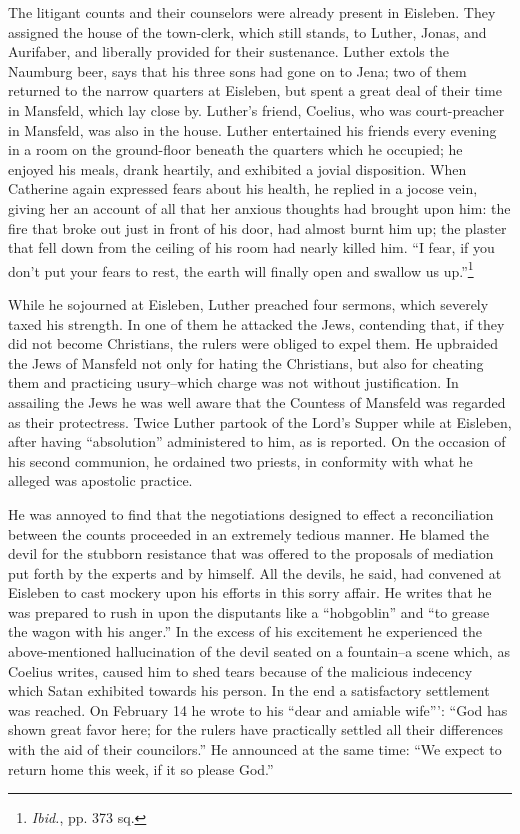 The litigant counts and their counselors were already present in
Eisleben. They assigned the house of the town-clerk, which still
stands, to Luther, Jonas, and Aurifaber, and liberally provided for
their sustenance. Luther extols the Naumburg beer, says that his
three sons had gone on to Jena; two of them returned to the narrow
quarters at Eisleben, but spent a great deal of their time in Mansfeld,
which lay close by. Luther’s friend, Coelius, who was court-preacher
in Mansfeld, was also in the house. Luther entertained his
friends every evening in a room on the ground-floor beneath the quarters
which he occupied; he enjoyed his meals, drank heartily, and exhibited
a jovial disposition. When Catherine again expressed fears
about his health, he replied in a jocose vein, giving her an account
of all that her anxious thoughts had brought upon him: the fire that
broke out just in front of his door, had almost burnt him up; the
plaster that fell down from the ceiling of his room had nearly killed
him. “I fear, if you don’t put your fears to rest, the earth will finally
open and swallow us up.”\footnote{\textit{Ibid.}, pp. 373 sq.}

While he sojourned at Eisleben, Luther preached four sermons,
which severely taxed his strength. In one of them he attacked the
Jews, contending that, if they did not become Christians, the rulers
were obliged to expel them. He upbraided the Jews of Mansfeld not
only for hating the Christians, but also for cheating them and practicing
usury--which charge was not without justification. In assailing
the Jews he was well aware that the Countess of Mansfeld was regarded
as their protectress. Twice Luther partook of the Lord’s
Supper while at Eisleben, after having “absolution” administered to
him, as is reported. On the occasion of his second communion, he
ordained two priests, in conformity with what he alleged was apostolic practice.

He was annoyed to find that the negotiations designed to effect a
reconciliation between the counts proceeded in an extremely tedious
manner. He blamed the devil for the stubborn resistance that was
offered to the proposals of mediation put forth by the experts and by
himself. All the devils, he said, had convened at Eisleben to cast
mockery upon his efforts in this sorry affair. He writes that he was
prepared to rush in upon the disputants like a “hobgoblin” and “to
grease the wagon with his anger.” In the excess of his excitement
he experienced the above-mentioned hallucination of the devil seated
on a fountain--a scene which, as Coelius writes, caused him to shed
tears because of the malicious indecency which Satan exhibited
towards his person. In the end a satisfactory settlement was reached.
On February 14 he wrote to his “dear and amiable wife”’: “God has
shown great favor here; for the rulers have practically settled all
their differences with the aid of their councilors.” He announced at
the same time: “We expect to return home this week, if it so please
God.”

